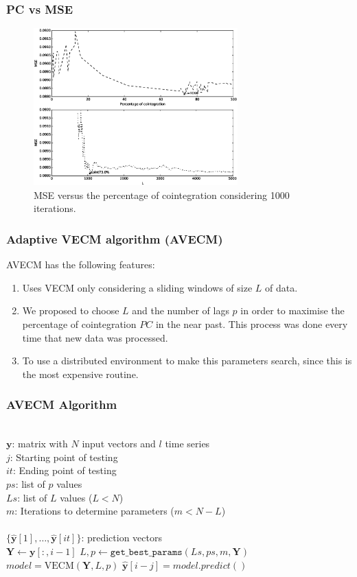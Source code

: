 \documentclass{beamer}
\begin{document}
\begin{frame}
\frametitle{PC vs MSE}
\begin{figure}[ht!]
  \centering
  \includegraphics[width=0.7\textwidth]{img/51_Fig2}
  \caption{MSE versus the percentage of cointegration considering 1000
  iterations. }
  \label{fig:cointvsmse}
\end{figure}
\end{frame}

\begin{frame}
\frametitle{Adaptive VECM algorithm (AVECM)}
AVECM has the following features: 
\begin{enumerate}
\item Uses VECM only considering a sliding windows of size $L$ of data.
\item We proposed to choose $L$ and the number of lags $p$ in order to maximise the percentage of cointegration $PC$ in the near past. This process was done every time that new data was processed. 
\item To use a distributed environment to make this parameters search, since this is the most expensive routine.
\end{enumerate}
\end{frame}


\begin{frame}
\frametitle{AVECM Algorithm}
\small
\begin{algorithmic}[1]
\REQUIRE $\,$ \\
$\mathbf{y}$: matrix with $N$ input vectors and $l$ time series\\
$j$: Starting point of testing \\
$it$: Ending point of testing \\
$ps$: list of $p$ values \\
$Ls$: list of $L$ values ($L<N$) \\
$m$: Iterations to determine parameters ($m < N-L$)\\
\ENSURE  $\,$ \\
$\{ \hat{\mathbf{y}}[1],\dots,\hat{\mathbf{y}}[it]\}$: prediction vectors \\
   \STATE $\mathbf{Y} \gets \mathbf{y}[:,i-1]$
    \STATE $L,p \gets
    \texttt{get\_best\_params}(Ls,ps,m,\mathbf{Y})$
        \STATE $model = \text{VECM}(\mathbf{Y},L, p)$
        \STATE $\hat{\mathbf{y}}[i-j] = model.predict()$
\ENDFOR
\end{algorithmic}
\end{frame}
\end{document}
